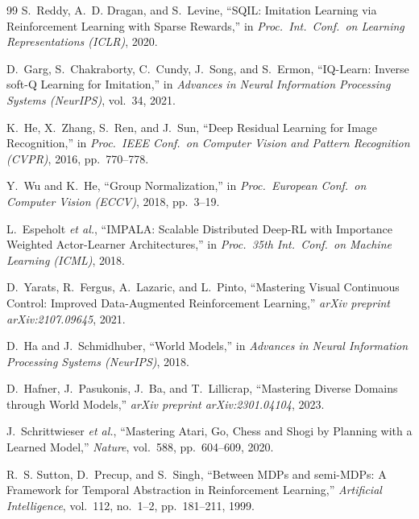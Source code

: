 \begin{thebibliography}{99}
S.~Reddy, A.~D. Dragan, and S.~Levine,
``SQIL: Imitation Learning via Reinforcement Learning with Sparse Rewards,''
in \emph{Proc.\ Int.\ Conf.\ on Learning Representations (ICLR)}, 2020.

D.~Garg, S.~Chakraborty, C.~Cundy, J.~Song, and S.~Ermon,
``IQ-Learn: Inverse soft-Q Learning for Imitation,''
in \emph{Advances in Neural Information Processing Systems (NeurIPS)},
vol.~34, 2021.


K.~He, X.~Zhang, S.~Ren, and J.~Sun,
``Deep Residual Learning for Image Recognition,''
in \emph{Proc.\ IEEE Conf.\ on Computer Vision and Pattern Recognition
(CVPR)}, 2016, pp.~770--778.

Y.~Wu and K.~He,
``Group Normalization,''
in \emph{Proc.\ European Conf.\ on Computer Vision (ECCV)}, 2018,
pp.~3--19.

L.~Espeholt \emph{et al.},
``IMPALA: Scalable Distributed Deep-RL with Importance Weighted
Actor-Learner Architectures,''
in \emph{Proc.\ 35th Int.\ Conf.\ on Machine Learning (ICML)}, 2018.

D.~Yarats, R.~Fergus, A.~Lazaric, and L.~Pinto,
``Mastering Visual Continuous Control: Improved Data-Augmented
Reinforcement Learning,''
\emph{arXiv preprint arXiv:2107.09645}, 2021.


D.~Ha and J.~Schmidhuber,
``World Models,''
in \emph{Advances in Neural Information Processing Systems (NeurIPS)},
2018.

D.~Hafner, J.~Pasukonis, J.~Ba, and T.~Lillicrap,
``Mastering Diverse Domains through World Models,''
\emph{arXiv preprint arXiv:2301.04104}, 2023.

J.~Schrittwieser \emph{et al.},
``Mastering Atari, Go, Chess and Shogi by Planning with a Learned Model,''
\emph{Nature}, vol.~588, pp.~604--609, 2020.

R.~S. Sutton, D.~Precup, and S.~Singh,
``Between MDPs and semi-MDPs: A Framework for Temporal Abstraction in
Reinforcement Learning,''
\emph{Artificial Intelligence}, vol.~112, no.~1--2, pp.~181--211, 1999.


\end{thebibliography}

